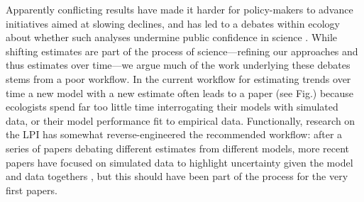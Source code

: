 \documentclass[11pt]{article}
\begin{document}
Apparently conflicting results have made it harder for policy-makers to advance initiatives aimed at slowing declines, and has led to a debates within ecology about whether such analyses undermine public confidence in science  \citep{gonzalez2016estimating}. While shifting estimates are part of the process of science---refining our approaches and thus estimates over time---we argue much of the work underlying these debates stems from a poor workflow. In the current workflow for estimating trends over time a new model with a new estimate often leads to a paper (see Fig.) because ecologists spend far too little time interrogating their models with simulated data, or their model performance fit to empirical data. Functionally, research on the LPI has somewhat reverse-engineered the recommended workflow: after a series of papers debating different estimates from different models, more recent papers have focused on simulated data to highlight uncertainty given the model and data togethers \citep[though I don't think they link their simulations to the model they use that well,][]{dove2023quantifying,toszogyova2024mathematical}, but this should have been part of the process for the very first papers.
\end{document}
